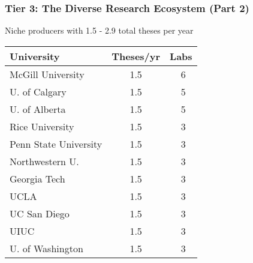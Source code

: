 \documentclass[aspectratio=169]{beamer}
\newcommand{\tabletext}{\small}
\begin{document}
\begin{frame}
    \frametitle{Tier 3: The Diverse Research Ecosystem (Part 2)}
    Niche producers with 1.5 - 2.9 total theses per year
    
    \begin{table}
        \centering
        \tabletext
        \begin{tabularx}{\textwidth}{
            l
            S[table-format=1.1]
            S[table-format=2.0, table-space-text-pre=~]
        }
            \toprule
            \textbf{University} & {\textbf{Theses/yr}} & {\textbf{Labs}} \\
            \midrule
            McGill University & 1.5 & ~6 \\
            U. of Calgary & 1.5 & ~5 \\
            U. of Alberta & 1.5 & ~5 \\
            Rice University & 1.5 & ~3 \\
            Penn State University & 1.5 & ~3 \\
            Northwestern U. & 1.5 & ~3 \\
            Georgia Tech & 1.5 & ~3 \\
            UCLA & 1.5 & ~3 \\
            UC San Diego & 1.5 & ~3 \\
            UIUC & 1.5 & ~3 \\
            U. of Washington & 1.5 & ~3 \\
            \bottomrule
        \end{tabularx}
    \end{table}
\end{frame}
\end{document}
